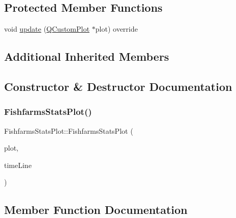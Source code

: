\subsection*{Protected Member Functions}
\begin{DoxyCompactItemize}
\item 
void \mbox{\hyperlink{class_fishfarms_stats_plot_ae089d568ff8a9936fb9b5c9d2e3f6ee1}{update}} (\mbox{\hyperlink{class_q_custom_plot}{Q\+Custom\+Plot}} $\ast$plot) override
\end{DoxyCompactItemize}
\subsection*{Additional Inherited Members}


\subsection{Constructor \& Destructor Documentation}
\mbox{\label{class_fishfarms_stats_plot_aaf74f522a65c0403993f60f1a1a23f09}} 
\subsubsection{\texorpdfstring{FishfarmsStatsPlot()}{FishfarmsStatsPlot()}}
{\footnotesize\ttfamily Fishfarms\+Stats\+Plot\+::\+Fishfarms\+Stats\+Plot (\begin{DoxyParamCaption}\item[{\mbox{\hyperlink{class_q_custom_plot}{Q\+Custom\+Plot}} $\ast$}]{plot,  }\item[{\mbox{\hyperlink{class_q_c_p_item_line}{Q\+C\+P\+Item\+Line}} $\ast$}]{time\+Line }\end{DoxyParamCaption})}



\subsection{Member Function Documentation}
\mbox{\label{class_fishfarms_stats_plot_afd4b993166feb348811d4ab9d0ebb6fa}} 
